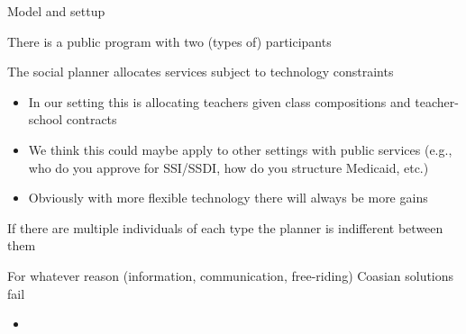 \documentclass[t,aspectratio=169,11pt,presentation]{beamer}
\newenvironment{wideitemize}{\itemize\addtolength{\itemsep}{14pt}}{\enditemize}
\begin{document}
\begin{frame}{Model and settup }

\begin{wideitemize}
     \item There is a public program with two (types of) participants
     \item The social planner allocates services subject to technology constraints
     \begin{itemize}
         \item In our setting this is allocating teachers given class compositions and teacher-school contracts
         \item We think this could maybe apply to other settings with public services (e.g., who do you approve for SSI/SSDI, how do you structure Medicaid, etc.)
         \item Obviously with more flexible technology there will always be more gains
     \end{itemize}
     \item If there are multiple individuals of each type the planner is indifferent between them
     \item For whatever reason (information, communication, free-riding) Coasian solutions fail
     \begin{itemize}
         \item 
     \end{itemize}
     

\end{wideitemize}
\end{frame}
\end{document}
